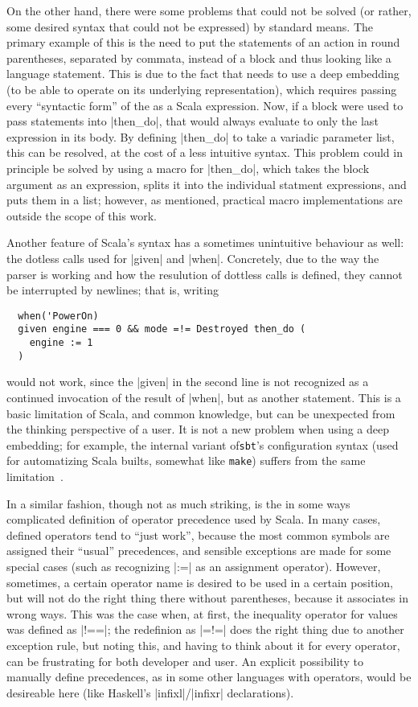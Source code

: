 On the other hand, there were some problems that could not be solved (or rather, some desired syntax
that could not be expressed) by standard means. The primary example of this is the need to put the
statements of an action in round parentheses, separated by commata, instead of a block and thus
looking like a language statement. This is due to the fact that \actium{} needs to use a deep
embedding (to be able to operate on its underlying representation), which requires passing every
\enquote{syntactic form} of the \dsl{} as a Scala expression. Now, if a block were used to pass
statements into |then_do|, that would always evaluate to only the last expression in its body. By
defining |then_do| to take a variadic parameter list, this can be resolved, at the cost of a less
intuitive syntax. This problem could in principle be solved by using a macro for |then_do|, which
takes the block argument as an expression, splits it into the individual statment expressions, and
puts them in a list; however, as mentioned, practical macro implementations are outside the scope of
this work.

Another feature of Scala's syntax has a sometimes unintuitive behaviour as well: the dotless calls
used for |given| and |when|. Concretely, due to the way the parser is working and how the resulution
of dottless calls is defined, they cannot be interrupted by newlines; that is, writing
\begin{lstlisting}
  when('PowerOn) 
  given engine === 0 && mode =!= Destroyed then_do (
    engine := 1
  )
\end{lstlisting}
would not work, since the |given| in the second line is not recognized as a continued invocation of
the result of |when|, but as another statement. This is a basic limitation of Scala, and common
knowledge, but can be unexpected from the thinking perspective of a \dsl{} user. It is not a new
problem when using a deep embedding; for example, the internal \dsl{} variant of\texttt{sbt}'s
configuration syntax (used for automatizing Scala builts, somewhat like \texttt{make}) suffers from
the same limitation~\cite{sbt2015:reference}.

In a similar fashion, though not as much striking, is the in some ways complicated definition of
operator precedence used by Scala. In many cases, defined operators tend to \enquote{just work},
because the most common symbols are assigned their \enquote{usual} precedences, and sensible
exceptions are made for some special cases (such as recognizing |:=| as an assignment
operator). However, sometimes, a certain operator name is desired to be used in a certain position,
but will not do the right thing there without parentheses, because it associates in wrong ways. This
was the case when, at first, the inequality operator for values was defined as |!==|; the redefinion
as |=!=| does the right thing due to another exception rule, but noting this, and having to think
about it for every operator, can be frustrating for both developer and \dsl{} user. An explicit
possibility to manually define precedences, as in some other languages with operators, would be
desireable here (like Haskell's |infixl|/|infixr| declarations).

